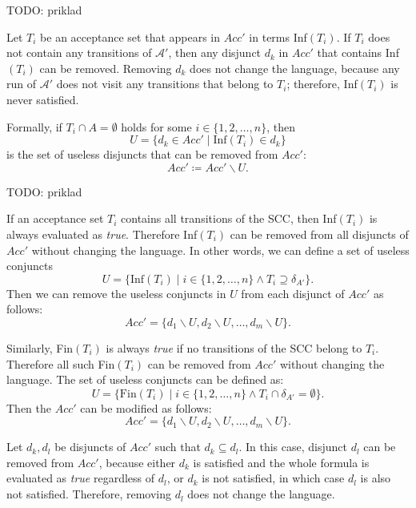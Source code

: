 \documentclass[
  digital, %
  twoside, %
  table,   %
  lof,     %
  lot,     %
]{fithesis3}
\begin{document}
TODO: priklad

Let $T_i$ be an acceptance set that appears in $Acc'$ in terms Inf$(T_i)$. If $T_i$ does not contain any transitions of $\mathcal{A'}$, then any disjunct $d_k$ in $Acc'$ that contains Inf$(T_i)$ can be removed. Removing $d_k$ does not change the language, because any run of $\mathcal{A'}$ does not visit any transitions that belong to $T_i$; therefore, Inf$(T_i)$ is never satisfied.

Formally, if $T_i \cap A = \emptyset$ holds for some $i \in \{1,2, \dots, n\}$, then 
\begin{equation*}
  U = \{d_k \in Acc' \mid \text{Inf}(T_i) \in d_k \}
\end{equation*}
is the set of useless disjuncts that can be removed from $Acc'$:
\begin{equation*}
  Acc' \coloneqq Acc' \smallsetminus U.
\end{equation*}

TODO: priklad

If an acceptance set $T_i$ contains all transitions of the SCC, then Inf$(T_i)$ is always evaluated as \emph{true}. Therefore Inf$(T_i)$ can be removed from all disjuncts of $Acc'$ without changing the language. 
In other words, we can define a set of useless conjuncts 
\begin{equation*}
  U = \{\text{Inf}(T_i) \mid i \in \{1,2, \dots, n\} \wedge T_i \supseteq \delta_{A'}\}.
\end{equation*}
Then we can remove the useless conjuncts in $U$ from each disjunct of $Acc'$ as follows:
\begin{equation*}
  Acc' = \{d_1 \smallsetminus U, d_2 \smallsetminus U, \dots, d_m \smallsetminus U\}.
\end{equation*}

Similarly, Fin$(T_i)$ is always \emph{true} if no transitions of the SCC belong to $T_i$. Therefore all such Fin$(T_i)$ can be removed from $Acc'$ without changing the language.
The set of useless conjuncts can be defined as:
\begin{equation*}
  U = \{\text{Fin}(T_i) \mid i \in \{1,2, \dots, n\} \wedge T_i \cap \delta_{A'} = \emptyset\}.
\end{equation*}
Then the $Acc'$ can be modified as follows:
\begin{equation*}
  Acc' = \{d_1 \smallsetminus U, d_2 \smallsetminus U, \dots, d_m \smallsetminus U\}.
\end{equation*}

Let $d_k, d_l$ be disjuncts of $Acc'$ such that $d_k \subseteq d_l$. In this case, disjunct $d_l$ can be removed from $Acc'$, because either $d_k$ is satisfied and the whole formula is evaluated as \emph{true} regardless of $d_l$, or $d_k$ is not satisfied, in which case $d_l$ is also not satisfied. Therefore, removing $d_l$ does not change the language.
\end{document}
